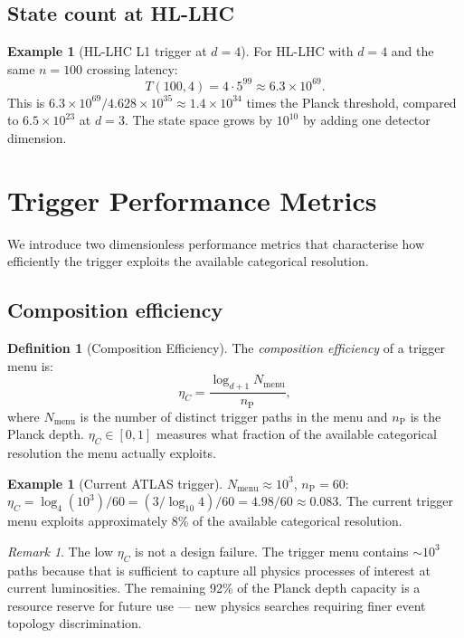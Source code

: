 \documentclass[twocolumn,10pt,a4paper]{article}
\theoremstyle{thmstyle}
\theoremstyle{definition}
\newtheorem{definition}[theorem]{Definition}
\newtheorem{example}[theorem]{Example}
\theoremstyle{remark}
\newtheorem{remark}[theorem]{Remark}
\newcommand{\nP}{n_{\mathrm{P}}}
\newcommand{\etaC}{\eta_{C}}
\begin{document}
\subsection{State count at HL-LHC}

\begin{example}[HL-LHC L1 trigger at $d = 4$]
For HL-LHC with $d = 4$ and the same $n = 100$ crossing latency:
\[
T(100, 4) = 4 \cdot 5^{99} \approx 6.3 \times 10^{69}.
\]
This is $6.3\times 10^{69}/4.628\times 10^{35} \approx 1.4 \times 10^{34}$
times the Planck threshold, compared to $6.5 \times 10^{23}$ at $d = 3$.
The state space grows by $10^{10}$ by adding one detector dimension.
\end{example}

\section{Trigger Performance Metrics}
\label{sec:metrics}

We introduce two dimensionless performance metrics that characterise how
efficiently the trigger exploits the available categorical resolution.

\subsection{Composition efficiency}

\begin{definition}[Composition Efficiency]
\label{def:etaC}
The \emph{composition efficiency} of a trigger menu is:
\begin{equation}
\etaC = \frac{\log_{d+1} N_{\mathrm{menu}}}{\nP},
\label{eq:etaC}
\end{equation}
where $N_{\mathrm{menu}}$ is the number of distinct trigger paths in the
menu and $\nP$ is the Planck depth. $\etaC \in [0, 1]$ measures what
fraction of the available categorical resolution the menu actually exploits.
\end{definition}

\begin{example}[Current ATLAS trigger]
$N_{\mathrm{menu}} \approx 10^3$, $\nP = 60$:
$\etaC = \log_4(10^3)/60 = (3/\log_{10}4)/60 = 4.98/60 \approx 0.083$.
The current trigger menu exploits approximately 8\% of the available
categorical resolution.
\end{example}

\begin{remark}
The low $\etaC$ is not a design failure. The trigger menu contains
$\sim 10^3$ paths because that is sufficient to capture all physics
processes of interest at current luminosities. The remaining 92\% of the
Planck depth capacity is a resource reserve for future use — new physics
searches requiring finer event topology discrimination.
\end{remark}
\end{document}

